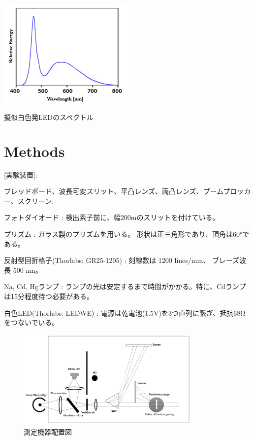 \documentclass[a4paper,10pt]{jsarticle}
\makeatletter
\newenvironment{figurehere}
{\def\@captype{figure}}
{}
\makeatother
\begin{document}
\begin{multicols}{2}
\begin{figurehere}
 \centering
 \includegraphics[width=0.5\textwidth]{figs/led_sample.pdf}
 \caption{擬似白色発LEDのスペクトル}
\end{figurehere}




\clearpage
\end{multicols}
\section{Methods}

[実験装置]:

ブレッドボード、波長可変スリット、平凸レンズ、両凸レンズ、ブームプロッカー、スクリーン.

フォトダイオード : 検出素子前に、幅200\textmu mのスリットを付けている。

プリズム : ガラス製のプリズムを用いる。 形状は正三角形であり、頂角は60°である。

反射型回折格子(Thorlabs: GR25-1205) : 刻線数は 1200 lines/mm、 ブレーズ波長 500 nm。

Na, Cd, Hgランプ : ランプの光は安定するまで時間がかかる。特に、Cdランプは15分程度待つ必要がある。

白色LED(Thorlabs: LEDWE) : 電源は乾電池(1.5V)を3つ直列に繋ぎ、抵抗68Ωをつないでいる。
\\
\begin{figure}[H]
  \centering
  \includegraphics[width=0.8\textwidth]{figs/kougakukei.pdf}
  \caption{測定機器配置図}
\end{figure}
\end{document}
